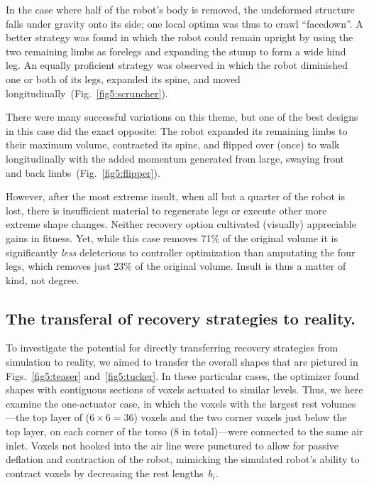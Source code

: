 

In the case where half of the robot's body is removed, the undeformed structure falls under gravity onto its side; one local optima was thus to crawl ``facedown''.
A better strategy was found in which the robot could remain upright by using the two remaining limbs as forelegs and expanding the stump to form a wide hind leg.
An equally proficient strategy was observed in which the robot diminished one or both of its legs, expanded its spine, and moved longitudinally~(Fig.~\ref{fig5:scruncher}).




There were many successful variations on this theme,
but one of the best designs in this case did the exact opposite: The robot expanded its remaining limbs to their maximum volume, contracted its spine, and flipped over (once) to walk longitudinally with the added momentum generated from large, swaying front and back limbs~(Fig.~\ref{fig5:flipper}).




However, after the most extreme insult, when all but a quarter of the robot is lost, there is insufficient material to regenerate legs or execute other more extreme shape changes. 
Neither recovery option cultivated (visually) appreciable gains in fitness.
Yet, while this case removes 71\% of the original volume it is significantly \textit{less} deleterious to controller optimization than amputating the four legs, which removes just 23\% of the original volume.
Insult is thus a matter of kind, not degree.


\subsection*{The transferal of recovery strategies to reality.}


To investigate the potential for directly transferring recovery strategies from simulation to reality, we aimed to transfer the overall shapes that are pictured in Figs.~\ref{fig5:teaser} and~\ref{fig5:tucker}. 
In these particular cases, the optimizer found shapes with contiguous sections of voxels actuated to similar levels. 
Thus, we here examine the one-actuator case, in which the voxels with the largest rest volumes---the top layer of ($6\times6=36$) voxels and the two corner voxels just below the top layer, on each corner of the torso (8 in total)---were connected to the same air inlet. 
Voxels not hooked into the air line were punctured to allow for passive deflation and contraction of the robot, mimicking the simulated robot's ability to contract voxels by decreasing the rest lengths~$b_i$. 




